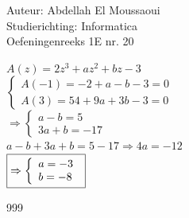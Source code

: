 \documentclass[a4paper]{article}
\begin{document}
  
\noindent \large Auteur: Abdellah El Moussaoui \\
\noindent \large Studierichting: Informatica\\
\noindent \large Oefeningenreeks 1E nr. 20\\

\medskip

\normalsize

\medskip

$A(z)=2z^3+az^2+bz-3$\\

$\left\{
\begin{array}{l}
A(-1)=-2+a-b-3=0\\
A(3)=54+9a+3b-3=0
\end{array}
\right.$\\

$\Rightarrow
\left\{
\begin{array}{l}
a-b=5\\
3a+b=-17
\end{array}
\right.$\\

$a-b + 3a+b = 5 - 17 \Rightarrow 4a=-12$\\

$
\boxed{
\Rightarrow
\left\{
\begin{array}{l}
a=-3\\
b=-8
\end{array}
\right.\\
}$



\begin{thebibliography}{999}
\end{thebibliography}
\end{document}
